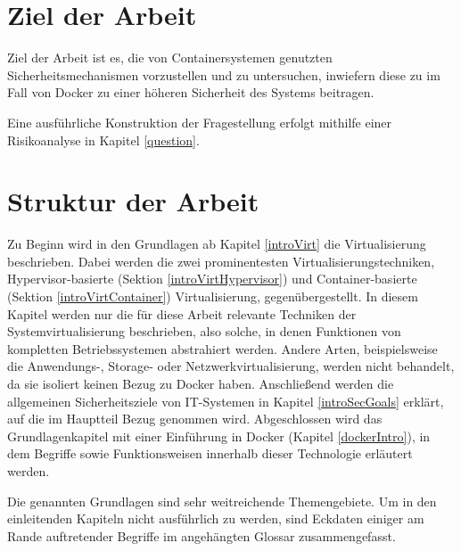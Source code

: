 \documentclass[../main.tex]{subfiles}
\begin{document}


  \section{Ziel der Arbeit}
    Ziel der Arbeit ist es, die von Containersystemen genutzten Sicherheitsmechanismen vorzustellen und zu untersuchen, inwiefern diese zu im Fall von Docker zu einer höheren Sicherheit des Systems beitragen.

    Eine ausführliche Konstruktion der Fragestellung erfolgt mithilfe einer Risikoanalyse in Kapitel \ref{question}.

  \section{Struktur der Arbeit}
    Zu Beginn wird in den Grundlagen ab Kapitel \ref{introVirt} die Virtualisierung beschrieben. Dabei werden die zwei prominentesten Virtualisierungstechniken, Hypervisor-basierte (Sektion \ref{introVirtHypervisor}) und Container-basierte (Sektion \ref{introVirtContainer}) Virtualisierung, gegenübergestellt. In diesem Kapitel werden nur die für diese Arbeit relevante Techniken der Systemvirtualisierung beschrieben, also solche, in denen Funktionen von kompletten Betriebssystemen abstrahiert werden. Andere Arten, beispielsweise die Anwendungs-, Storage- oder Netzwerkvirtualisierung, werden nicht behandelt, da sie isoliert keinen Bezug zu Docker haben. Anschließend werden die allgemeinen Sicherheitsziele von \acrshort{IT}-Systemen in Kapitel \ref{introSecGoals} erklärt, auf die im Hauptteil Bezug genommen wird. Abgeschlossen wird das Grundlagenkapitel mit einer Einführung in Docker (Kapitel \ref{dockerIntro}), in dem Begriffe sowie Funktionsweisen innerhalb dieser Technologie erläutert werden.

    Die genannten Grundlagen sind sehr weitreichende Themengebiete. Um in den einleitenden Kapiteln nicht ausführlich zu werden, sind Eckdaten einiger am Rande auftretender Begriffe im angehängten Glossar zusammengefasst.
\end{document}
